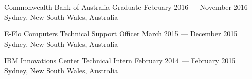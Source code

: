 \begin{experiences}
  \expitem
  {Commonwealth Bank of Australia} %
  {Graduate} %
  {February 2016 --- November 2016} %
  {Sydney, New South Wales, Australia} %
  {} %
  {} %
  {} %

  \expitem
  {E-Flo Computers} %
  {Technical Support Officer} %
  {March 2015 --- December 2015} %
  {Sydney, New South Wales, Australia} %
  {} %
  {} %
  {} %

  \expitem
  {IBM} %
  {Innovations Center Technical Intern} %
  {February 2014 --- February 2015} %
  {Sydney, New South Wales, Australia} %
  {} %
  {} %
  {} %

\end{experiences}
